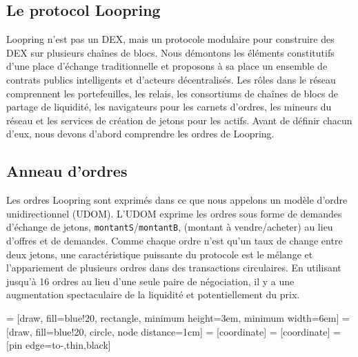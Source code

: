\documentclass[UTF8,nofonts]{article}
\makeatletter
\newenvironment{figurehere}
 {\def\@captype{figure}}
 {}
\makeatother
\begin{document}
\begin{multicols}{2}
\section{Le protocol Loopring\label{sec:loopring_protocol}}
Loopring n'est pas un DEX, mais un protocole modulaire pour construire des DEX sur plusieurs chaînes de blocs. Nous démontons les éléments constitutifs d'une place d’échange traditionnelle et proposons à sa place un ensemble de contrats publics intelligents et d'acteurs décentralisés. Les rôles dans le réseau comprennent les portefeuilles, les relais, les consortiums de chaînes de blocs de partage de liquidité, les navigateurs pour les carnets d'ordres, les mineurs du réseau et les services de création de jetons pour les actifs. Avant de définir chacun d'eux, nous devons d'abord comprendre les ordres de Loopring. 


\subsection{Anneau d'ordres\label{sec:order_ring}}
Les ordres Loopring sont exprimés dans ce que nous appelons un modèle d'ordre unidirectionnel (UDOM)\cite{coinport2014udom}. L'UDOM exprime les ordres sous forme de demandes d'échange de jetons, \verb|montantS|/\verb|montantB|, (montant à vendre/acheter) au lieu d'offres et de demandes. Comme chaque ordre n'est qu'un taux de change entre deux jetons, une caractéristique puissante du protocole est le mélange et l'appariement de plusieurs ordres dans des transactions circulaires. En utilisant jusqu'à 16 ordres au lieu d'une seule paire de négociation, il y a une augmentation spectaculaire de la liquidité et potentiellement du prix.  

\begin{center}
\begin{figurehere}
\centering
{} = [draw, fill=blue!20, rectangle, 
    minimum height=3em, minimum width=6em]
 = [draw, fill=blue!20, circle, node distance=1cm]
 = [coordinate]
 = [coordinate]
 = [pin edge={to-,thin,black}]

\begin{tikzpicture}[
    auto, 
    node distance=2cm,
    >=latex',
    font=\bfseries\footnotesize\sffamily,
    order/.style={
		scale=0.7,
		rectangle,
		rounded corners,
		draw=black, 
		text centered,
		minimum height=12mm,
		fill=white
	},
	label/.style={
		scale=0.7
	}
  ]


\end{tikzpicture}
\end{figurehere}
\end{center}
\end{multicols}
\end{document}
